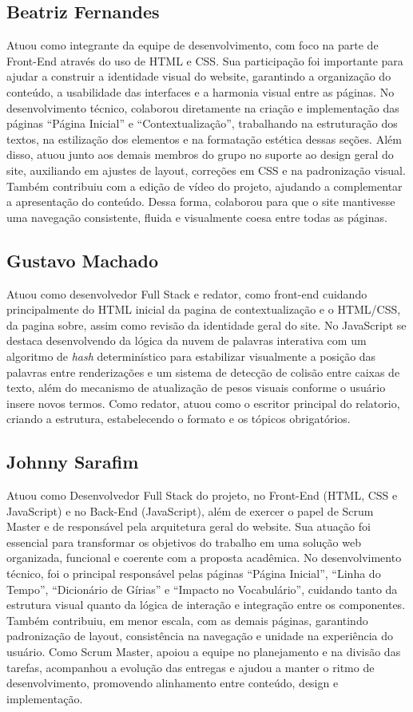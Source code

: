 \documentclass[12pt,a4paper]{article}
\begin{document}
\subsection{Beatriz Fernandes}
Atuou como integrante da equipe de desenvolvimento, com foco na parte de Front-End através do uso de HTML e CSS. Sua participação foi importante para ajudar a construir a identidade visual do website, garantindo a organização do conteúdo, a usabilidade das interfaces e a harmonia visual entre as páginas. No desenvolvimento técnico, colaborou diretamente na criação e implementação das páginas “Página Inicial” e “Contextualização”, trabalhando na estruturação dos textos, na estilização dos elementos e na formatação estética dessas seções.
Além disso, atuou junto aos demais membros do grupo no suporte ao design geral do site, auxiliando em ajustes de layout, correções em CSS e na padronização visual. Também contribuiu com a edição de vídeo do projeto, ajudando a complementar a apresentação do conteúdo. Dessa forma, colaborou para que o site mantivesse uma navegação consistente, fluida e visualmente coesa entre todas as páginas.

\subsection{Gustavo Machado}
Atuou como desenvolvedor Full Stack e redator, como front-end cuidando principalmente do HTML inicial da pagina de contextualização e o HTML/CSS, da pagina sobre, assim como revisão da identidade geral do site. No JavaScript se destaca desenvolvendo da lógica da nuvem de palavras interativa com
um algoritmo de \textit{hash} determinístico para estabilizar visualmente a posição das palavras
entre renderizações e um sistema de detecção de colisão entre caixas de texto, além do mecanismo
de atualização de pesos visuais conforme o usuário insere novos termos.
Como redator, atuou como o escritor principal do relatorio, criando a estrutura, estabelecendo o formato e os tópicos obrigatórios.

\subsection{Johnny Sarafim}
Atuou como Desenvolvedor Full Stack do projeto, no Front-End (HTML, CSS e JavaScript) e no Back-End (JavaScript), além de exercer o papel de Scrum Master e de responsável pela arquitetura geral do website. Sua atuação foi essencial para transformar os objetivos do trabalho em uma solução web organizada, funcional e coerente com a proposta acadêmica.
No desenvolvimento técnico, foi o principal responsável pelas páginas “Página Inicial”, “Linha do Tempo”, “Dicionário de Gírias” e “Impacto no Vocabulário”, cuidando tanto da estrutura visual quanto da lógica de interação e integração entre os componentes. Também contribuiu, em menor escala, com as demais páginas, garantindo padronização de layout, consistência na navegação e unidade na experiência do usuário.
Como Scrum Master, apoiou a equipe no planejamento e na divisão das tarefas, acompanhou a evolução das entregas e ajudou a manter o ritmo de desenvolvimento, promovendo alinhamento entre conteúdo, design e implementação.
\end{document}
